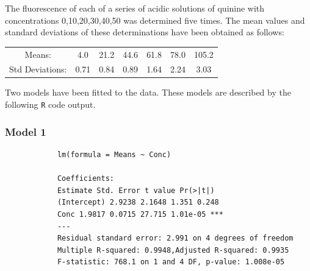 \documentclass[a4paper,12pt]{article}
\begin{document}
	
	
	The fluorescence of each of a series of acidic solutions of quinine with concentrations 0,10,20,30,40,50
	was determined five times. The mean values and standard deviations of these determinations have
	been obtained as follows:
	\begin{center}
		\begin{tabular}{|c|cccccc|}
			\hline
			Means: & 4.0 & 21.2& 44.6& 61.8& 78.0 &105.2\\
			Std Deviations: &0.71& 0.84 &0.89 &1.64 &2.24 &3.03\\
			\hline
		\end{tabular}
	\end{center}
	Two models have been fitted to the data. These models are described by the following \texttt{R} code output.
	
	
	\subsubsection*{Model 1}
		\begin{framed}
			
			
			
			\begin{verbatim}
			lm(formula = Means ~ Conc)
			
			Coefficients:
			Estimate Std. Error t value Pr(>|t|)
			(Intercept) 2.9238 2.1648 1.351 0.248
			Conc 1.9817 0.0715 27.715 1.01e-05 ***
			---
			Residual standard error: 2.991 on 4 degrees of freedom
			Multiple R-squared: 0.9948,Adjusted R-squared: 0.9935
			F-statistic: 768.1 on 1 and 4 DF, p-value: 1.008e-05
			\end{verbatim}
		\end{framed}
\end{document}
